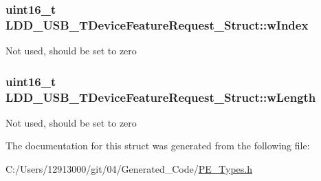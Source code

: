 \subsubsection[{w\+Index}]{\setlength{\rightskip}{0pt plus 5cm}uint16\+\_\+t L\+D\+D\+\_\+\+U\+S\+B\+\_\+\+T\+Device\+Feature\+Request\+\_\+\+Struct\+::w\+Index}\label{struct_l_d_d___u_s_b___t_device_feature_request___struct_a261267b70741fe26898665df42fec10b}
Not used, should be set to zero \hypertarget{struct_l_d_d___u_s_b___t_device_feature_request___struct_af0c222aa4585a132b2582fb1c290edc7}{}
\subsubsection[{w\+Length}]{\setlength{\rightskip}{0pt plus 5cm}uint16\+\_\+t L\+D\+D\+\_\+\+U\+S\+B\+\_\+\+T\+Device\+Feature\+Request\+\_\+\+Struct\+::w\+Length}\label{struct_l_d_d___u_s_b___t_device_feature_request___struct_af0c222aa4585a132b2582fb1c290edc7}
Not used, should be set to zero 

The documentation for this struct was generated from the following file\+:\begin{DoxyCompactItemize}
\item 
C\+:/\+Users/12913000/git/04/\+Generated\+\_\+\+Code/\hyperlink{_p_e___types_8h}{P\+E\+\_\+\+Types.\+h}\end{DoxyCompactItemize}
